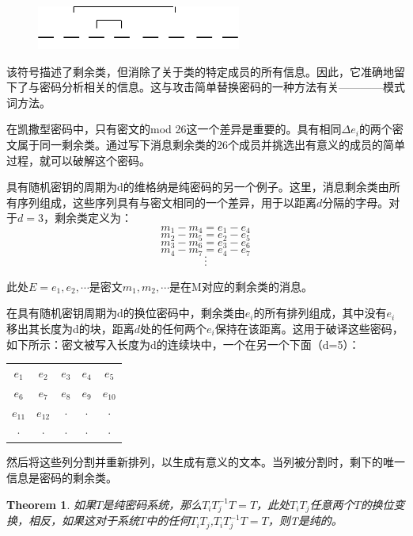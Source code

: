 \documentclass[]{article}
\newtheorem{theorem}{Theorem}
\begin{document}
\begin{figure}[htbp]
	\centering
	\includegraphics[width=0.6\textwidth]{pattern.png}
\end{figure}

该符号描述了剩余类，但消除了关于类的特定成员的所有信息。因此，它准确地留下了与密码分析相关的信息。这与攻击简单替换密码的一种方法有关————模式词方法。

在凯撒型密码中，只有密文的mod 26这一个差异是重要的。具有相同$\Delta e_i$的两个密文属于同一剩余类。通过写下消息剩余类的26个成员并挑选出有意义的成员的简单过程，就可以破解这个密码。

具有随机密钥的周期为d的维格纳是纯密码的另一个例子。这里，消息剩余类由所有序列组成，这些序列具有与密文相同的一个差异，用于以距离$d$分隔的字母。对于$d=3$，剩余类定义为：
\[m_1-m_4=e_1-e_4\]
\[m_2-m_5=e_2-e_5\]
\[m_3-m_6=e_3-e_6\]
\[m_4-m_7=e_4-e_7\]
\[\cdot\]
\[\cdot\]
\[\cdot\]

此处$E=e_1,e_2,\cdots$是密文$m_1,m_2,\cdots$是在M对应的剩余类的消息。

在具有随机密钥周期为d的换位密码中，剩余类由$e_i$的所有排列组成，其中没有$e_i$移出其长度为d的块，距离$d$处的任何两个$e_i$保持在该距离。这用于破译这些密码，如下所示：密文被写入长度为d的连续块中，一个在另一个下面（d=5）：\par
\begin{center}
	\begin{tabular}{c c c c c }
		
		$e_1$& $e_2$ & $e_3$ & $e_4$ & $e_5$ \\ 
		
		$e_6$& $e_7$ & $e_8$ & $e_9$ & $e_{10}$ \\ 
		
		$e_{11}$& $e_{12}$ & $\cdot$ & $\cdot$ & $\cdot$ \\ 
		
		$\cdot$& $\cdot$ & $\cdot$ & $\cdot$ & $\cdot$ \\ 
		
	\end{tabular} 
\end{center}

然后将这些列分割并重新排列，以生成有意义的文本。当列被分割时，剩下的唯一信息是密码的剩余类。

\begin{theorem}
	如果$T$是纯密码系统，那么$T_i T^{-1}_j T= T$，此处$T_iT_j$任意两个$T$的换位变换，相反，如果这对于系统$T$中的任何$T_iT_j$,$T_i T^{-1}_j T= T$，则T是纯的。
\end{theorem}
\end{document}
